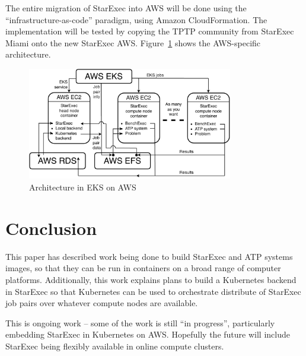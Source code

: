 \documentclass{easychair}
\begin{document}
The entire migration of StarExec into AWS will be done using the ``infrastructure-as-code'' 
paradigm, using Amazon CloudFormation. 
The implementation will be tested by copying the TPTP community from StarExec Miami onto the 
new StarExec AWS.
Figure~\ref{ArchitectureAWS} shows the AWS-specific architecture.

\begin{figure}[htb]
\begin{center}
\includegraphics[width=0.8\textwidth]{ArchitectureAWS}
\caption{Architecture in EKS on AWS}
\label{ArchitectureAWS}
\end{center}
\end{figure}

\section{Conclusion}
\label{Conclusion}

This paper has described work being done to build StarExec and ATP systems images, so that they 
can be run in containers on a broad range of computer platforms.
Additionally, this work explains plans to build a Kubernetes backend in StarExec so that 
Kubernetes can be used to orchestrate distribute of StarExec job pairs over whatever compute 
nodes are available.

This is ongoing work -- some of the work is still ``in progress'', particularly embedding
StarExec in Kubernetes on AWS.
Hopefully the future will include StarExec being flexibly available in online compute clusters.



\appendix
\end{document}
